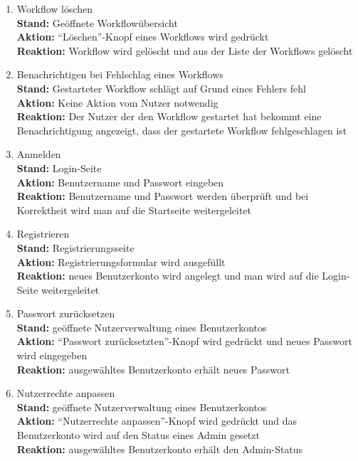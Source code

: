 \begin{enumerate}
    \item Workflow löschen
    \\ \textbf{Stand:} Geöffnete Workflowübersicht
    \\ \textbf{Aktion:} \enquote{Löschen}-Knopf eines Workflows wird gedrückt
    \\ \textbf{Reaktion:} Workflow wird gelöscht und aus der Liste der Workflows gelöscht
    \item Benachrichtigen bei Fehlschlag eines Workflows
    \\ \textbf{Stand:} Gestarteter Workflow schlägt auf Grund eines Fehlers fehl
    \\ \textbf{Aktion:} Keine Aktion vom \gls{Nutzer} notwendig
    \\ \textbf{Reaktion:} Der \gls{Nutzer} der den Workflow gestartet hat bekommt eine Benachrichtigung angezeigt, dass der gestartete Workflow fehlgeschlagen ist
    \item Anmelden
    \\ \textbf{Stand:} Login-Seite
    \\ \textbf{Aktion:} Benutzername und Passwort eingeben
    \\ \textbf{Reaktion:} Benutzername und Passwort werden überprüft und bei Korrektheit wird man auf die Startseite weitergeleitet
    \item Registrieren
    \\ \textbf{Stand:} Registrierungsseite
    \\ \textbf{Aktion:} Registrierungsformular wird ausgefüllt
    \\ \textbf{Reaktion:} neues Benutzerkonto wird angelegt und man wird auf die Login-Seite weitergeleitet
    \item Passwort zurücksetzen
    \\ \textbf{Stand:} geöffnete Nutzerverwaltung eines Benutzerkontos
    \\ \textbf{Aktion:} \enquote{Passwort zurücksetzten}-Knopf wird gedrückt und neues Passwort wird eingegeben
    \\ \textbf{Reaktion:} ausgewähltes Benutzerkonto erhält neues Passwort
    \item Nutzerrechte anpassen
    \\ \textbf{Stand:} geöffnete Nutzerverwaltung eines Benutzerkontos
    \\ \textbf{Aktion:} \enquote{Nutzerrechte anpassen}-Knopf wird gedrückt und das Benutzerkonto wird auf den Status eines \Gls{Admin} gesetzt
    \\ \textbf{Reaktion:} ausgewähltes Benutzerkonto erhält den \Gls{Admin}-Status

\end{enumerate}
